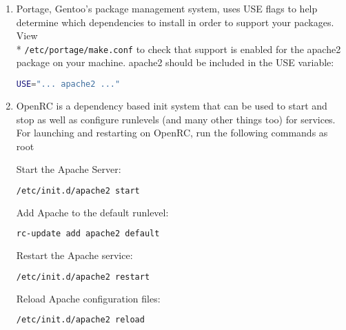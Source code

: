 \documentclass[11pt]{article}
\begin{document}
\begin{enumerate}

\item Portage, Gentoo's package management system, uses USE flags to help determine which dependencies to install in order to support your packages. View \\* \verb|/etc/portage/make.conf| to check that support is enabled for the apache2 package on your machine. apache2 should be included in the USE variable:

 \begin{lstlisting}[basicstyle=\ttfamily, backgroundcolor = \color{lightgray}, language = bash, xleftmargin = 0cm, framexleftmargin = 1em, showstringspaces=false]
USE="... apache2 ..."
\end{lstlisting}

  \item OpenRC is a dependency based init system that can be used to start and stop as well as configure runlevels (and many other things too) for services.  For launching and restarting on OpenRC, run the following commands as root
  
  Start the Apache Server:
  \begin{lstlisting}[basicstyle=\ttfamily, backgroundcolor = \color{lightgray}, language = bash, xleftmargin = 0cm, framexleftmargin = 1em]
/etc/init.d/apache2 start
\end{lstlisting}
  Add Apache to the default runlevel:
  \begin{lstlisting}[basicstyle=\ttfamily, backgroundcolor = \color{lightgray}, language = bash, xleftmargin = 0cm, framexleftmargin = 1em]
rc-update add apache2 default
\end{lstlisting}
  Restart the Apache service:
  \begin{lstlisting}[basicstyle=\ttfamily, backgroundcolor = \color{lightgray}, language = bash, xleftmargin = 0cm, framexleftmargin = 1em]
/etc/init.d/apache2 restart
\end{lstlisting}
  Reload Apache configuration files: 
  \begin{lstlisting}[basicstyle=\ttfamily, backgroundcolor = \color{lightgray}, language = bash, xleftmargin = 0cm, framexleftmargin = 1em]
/etc/init.d/apache2 reload
\end{lstlisting}


\end{enumerate}
\end{document}
